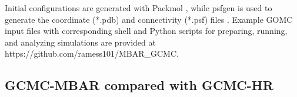 \documentclass[journal=jced,manuscript=article]{achemso}
\begin{document}
Initial configurations are generated with Packmol \cite{PACKMOL}, while psfgen is used to generate the coordinate (*.pdb) and connectivity (*.psf) files \cite{VMD}. Example GOMC input files with corresponding shell and Python scripts for preparing, running, and analyzing simulations are provided at https://github.com/ramess101/MBAR\_GCMC.



\subsection{GCMC-MBAR compared with GCMC-HR} \label{sec: GCMC-HR and GCMC-MBAR}
\end{document}
